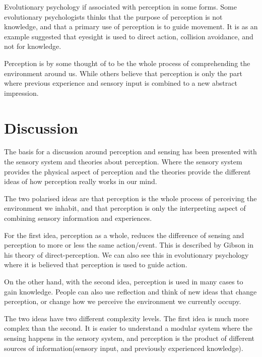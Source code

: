 \documentclass[12pt, a4paper]{article}
\begin{document}
Evolutionary psychology if associated with perception in some forms. Some
evolutionary psychologists thinks that the purpose of perception is not knowledge,
and that a primary use of perception is to guide movement. It is as an example
suggested that eyesight is used to direct action, collision avoidance, and not for knowledge. 

Perception is by some thought of to be the whole process of comprehending the
environment around us. While others believe that perception is only the part
where previous experience and sensory input is combined to a new abstract
impression. 

\section{Discussion}\label{conclusions}
The basis for a discussion around perception and sensing has been presented
with the sensory system and theories about perception. Where the sensory system provides the
physical aspect of perception and the theories provide the different ideas of
how perception really works in our mind.

The two polarised ideas are that perception is the whole process of perceiving
the environment we inhabit, and that perception is only the interpreting aspect
of combining sensory information and experiences. 

For the first idea, perception as a whole, reduces the difference of sensing
and perception to more or less the same action/event. This is described by
Gibson in his theory of direct-perception. We can also see this in evolutionary
psychology where it is believed that perception is used to guide action. 

On the other hand, with the second idea, perception is used in many cases to
gain knowledge. People can also use reflection and think of new ideas that
change perception, or change how we perceive the environment we currently
occupy.

The two ideas have two different complexity levels. The first idea is much more
complex than the second. It is easier to understand a modular system where the
sensing happens in the sensory system, and perception is the product of
different sources of information(sensory input, and previously experienced
knowledge).  
\end{document}
